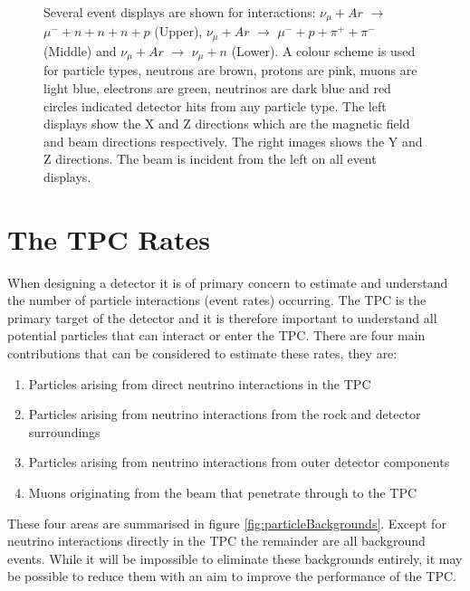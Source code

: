 \begin{figure}[htbp]
\begin{center}
	\caption{Several event displays are shown for interactions: $\nu_{\mu} + Ar$ $\rightarrow$ $\mu^{-} + n + n + n + p$ (Upper), $\nu_{\mu} + Ar$ $\rightarrow$ $\mu^{-} + p + \pi^{+} + \pi^{-}$ (Middle) and $\nu_{\mu} + Ar$ $\rightarrow$ $\nu_{\mu} + n$ (Lower). A colour scheme is used for particle types, neutrons are brown, protons are pink, muons are light blue, electrons are green, neutrinos are dark blue and red circles indicated detector hits from any particle type. The left displays show the X and Z directions which are the magnetic field and beam directions respectively. The right images shows the Y and Z directions. The beam is incident from the left on all event displays.}
	\label{fig:eventDisplays}
\end{center}
\end{figure}


\section{The TPC Rates}
When designing a detector it is of primary concern to estimate and understand the number of particle interactions (event rates) occurring. The TPC is the primary target of the detector and it is therefore important to understand all potential particles that can interact or enter the TPC. There are four main contributions that can be considered to estimate these rates, they are:
\begin{enumerate}
\setlength{\itemsep}{0.8pt}
	\item Particles arising from direct neutrino interactions in the TPC
	\item Particles arising from neutrino interactions from the rock and detector surroundings
	\item Particles arising from neutrino interactions from outer detector components
	\item Muons originating from the beam that penetrate through to the TPC
\end{enumerate}
These four areas are summarised in figure \ref{fig:particleBackgrounds}. Except for neutrino interactions directly in the TPC the remainder are all background events. While it will be impossible to eliminate these backgrounds entirely, it may be possible to reduce them with an aim to improve the performance of the TPC.

